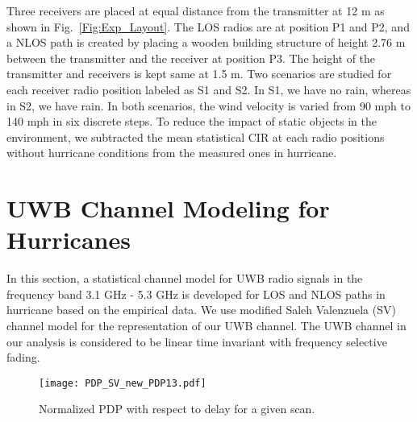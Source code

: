\documentclass[conference]{IEEEtran}
\begin{document}
Three receivers are placed at equal distance from the transmitter at 12 m as shown in Fig.~\ref{Fig:Exp_Layout}. The LOS radios are at position P1 and P2, and a NLOS path is created by placing a wooden building structure of height 2.76 m between the transmitter and the receiver at position P3. The height of the transmitter and receivers is kept same at 1.5 m. Two scenarios are studied for each receiver radio position labeled as S1 and S2. In S1, we have no rain, whereas in S2, we have rain. In both scenarios, the wind velocity is varied from 90 mph to 140 mph in six discrete steps. To reduce the impact of static objects in the environment, we subtracted the mean statistical CIR at each radio positions without hurricane conditions from the measured ones in hurricane.
 
\section{UWB Channel Modeling for Hurricanes}
In this section, a statistical channel model for UWB radio signals in the frequency band 3.1 GHz - 5.3 GHz is developed for LOS and NLOS paths in hurricane based on the empirical data. We use modified Saleh Valenzuela (SV) channel model \cite{Saleh} for the representation of our UWB channel. The UWB channel in our analysis is considered to be linear time invariant with frequency selective fading.    
\begin{figure}[!t]
  \texttt{[image: PDP\_SV\_new\_PDP13.pdf]}
 \caption{Normalized PDP with respect to delay for a given scan.}\label{Fig:PDP_SV}
\vspace{-0.4 cm}
\end{figure}
\end{document}
